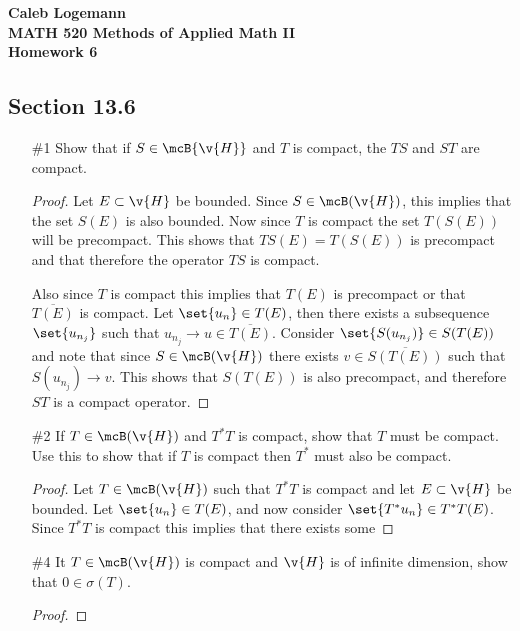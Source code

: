 \documentclass[11pt, oneside]{article}
\begin{document}
\noindent \textbf{\Large{Caleb Logemann \\
MATH 520 Methods of Applied Math II \\
Homework 6
}}

\subsection*{Section 13.6}
\begin{enumerate}
  \item[\#1] %
    Show that if $S \in \mcB{\v{H}}$ and $T$ is compact, the $TS$ and $ST$ are
    compact.

    \begin{proof}
      Let $E \subset \v{H}$ be bounded.
      Since $S \in \mcB(\v{H})$, this implies that the set $S(E)$ is also
      bounded.
      Now since $T$ is compact the set $T(S(E))$ will be precompact.
      This shows that $TS(E) = T(S(E))$ is precompact and that therefore the
      operator $TS$ is compact.

      Also since $T$ is compact this implies that $T(E)$ is precompact or that
      $\overline{T(E)}$ is compact.
      Let $\set{u_n} \in T(E)$, then there exists a subsequence $\set{u_{n_j}}$
      such that $u_{n_j} \to u \in \overline{T(E)}$.
      Consider $\set{S(u_{n_j})} \in S(T(E))$ and note that since
      $S \in \mcB(\v{H})$ there exists $v \in \overline{S(T(E))}$ such that
      $S(u_{n_j}) \to v$.
      This shows that $S(T(E))$ is also precompact, and therefore $ST$ is a
      compact operator.
    \end{proof}

  \pagebreak
  \item[\#2]
    If $T \in \mcB(\v{H})$ and $T^*T$ is compact, show that $T$ must be compact.
    Use this to show that if $T$ is compact then $T^*$ must also be compact.
    
    \begin{proof}
      Let $T \in \mcB(\v{H})$ such that $T^* T$ is compact and let
      $E \subset \v{H}$ be bounded.
      Let $\set{u_n} \in T(E)$, and now consider $\set{T^* u_n} \in T^* T(E)$.
      Since $T^* T$ is compact this implies that there exists some 
    \end{proof}

  \pagebreak
  \item[\#4]
    It $T \in \mcB(\v{H})$ is compact and $\v{H}$ is of infinite dimension,
    show that $0 \in \sigma(T)$.

    \begin{proof}
      

\end{proof}
\end{enumerate}
\end{document}
